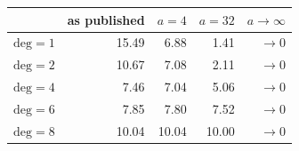 \begin{tabular}{@{}lrrrr@{}}
\toprule
& as published & \(a = 4\) & \(a = 32\) & \(a \to \infty\) \\
\midrule
\(\mathrm{deg} = 1\) & 15.49 & 6.88 & 1.41 & \(\to 0\) \\
\(\mathrm{deg} = 2\) & 10.67 & 7.08 & 2.11 & \(\to 0\) \\
\(\mathrm{deg} = 4\) & 7.46 & 7.04 & 5.06 & \(\to 0\) \\
\(\mathrm{deg} = 6\) & 7.85 & 7.80 & 7.52 & \(\to 0\) \\
\(\mathrm{deg} = 8\) & 10.04 & 10.04 & 10.00 & \(\to 0\) \\
\bottomrule
\end{tabular}
